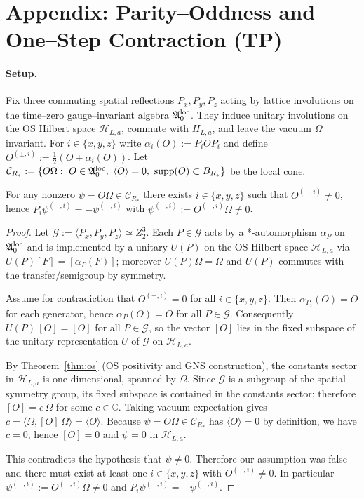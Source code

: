 \documentclass[11pt]{amsart}
\begin{document}
\section{Appendix: Parity--Oddness and One--Step Contraction (TP)}

\paragraph{Setup.}
Fix three commuting spatial reflections $P_x,P_y,P_z$ acting by lattice involutions on the time--zero gauge--invariant algebra $\mathfrak{A}_0^{\rm loc}$. They induce unitary involutions on the OS Hilbert space $\mathcal{H}_{L,a}$, commute with $H_{L,a}$, and leave the vacuum $\Omega$ invariant. For $i\in\{x,y,z\}$ write $\alpha_i(O):=P_i O P_i$ and define $O^{(\pm,i)}:=\tfrac12(O\pm\alpha_i(O))$. Let $\mathcal{C}_{R_*}:=\{O\Omega:\ O\in\mathfrak{A}_0^{\rm loc},\ \langle O\rangle=0,\ \mathrm{supp}(O)\subset B_{R_*}\}$ be the local cone.

\begin{lemma}\label{lem:oddness-tp}
For any nonzero $\psi=O\Omega\in\mathcal{C}_{R_*}$ there exists $i\in\{x,y,z\}$ such that $O^{(-,i)}\neq 0$, hence $P_i\psi^{(-,i)}=-\psi^{(-,i)}$ with $\psi^{(-,i)}:=O^{(-,i)}\Omega\neq 0$.
\end{lemma}

\begin{proof}
Let $\mathcal{G}:=\langle P_x,P_y,P_z\rangle\simeq Z_2^3$. Each $P\in\mathcal{G}$ acts by a *-automorphism $\alpha_P$ on $\mathfrak{A}_0^{\rm loc}$ and is implemented by a unitary $U(P)$ on the OS Hilbert space $\mathcal{H}_{L,a}$ via $U(P)[F]=[\alpha_P(F)]$; moreover $U(P)\Omega=\Omega$ and $U(P)$ commutes with the transfer/semigroup by symmetry.

Assume for contradiction that $O^{(-,i)}=0$ for all $i\in\{x,y,z\}$. Then $\alpha_{P_i}(O)=O$ for each generator, hence $\alpha_P(O)=O$ for all $P\in\mathcal{G}$. Consequently $U(P)\,[O]=[O]$ for all $P\in\mathcal{G}$, so the vector $[O]$ lies in the fixed subspace of the unitary representation $U$ of $\mathcal{G}$ on $\mathcal{H}_{L,a}$.

By Theorem~\ref{thm:os} (OS positivity and GNS construction), the constants sector in $\mathcal{H}_{L,a}$ is one-dimensional, spanned by $\Omega$. Since $\mathcal{G}$ is a subgroup of the spatial symmetry group, its fixed subspace is contained in the constants sector; therefore $[O]=c\,\Omega$ for some $c\in\mathbb{C}$. Taking vacuum expectation gives $c=\langle\Omega,[O]\,\Omega\rangle=\langle O\rangle$. Because $\psi=O\Omega\in\mathcal{C}_{R_*}$ has $\langle O\rangle=0$ by definition, we have $c=0$, hence $[O]=0$ and $\psi=0$ in $\mathcal{H}_{L,a}$.

This contradicts the hypothesis that $\psi\ne 0$. Therefore our assumption was false and there must exist at least one $i\in\{x,y,z\}$ with $O^{(-,i)}\ne 0$. In particular $\psi^{(-,i)}:=O^{(-,i)}\Omega\ne 0$ and $P_i\psi^{(-,i)}=-\psi^{(-,i)}$.
\end{proof}
\end{document}
